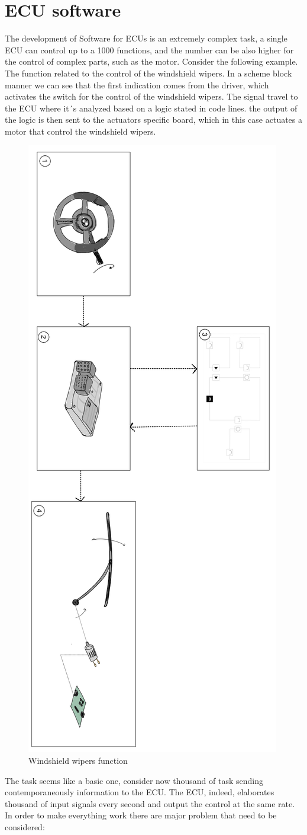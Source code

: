 \documentclass[../main.tex]{subfiles}
\begin{document}
\section{ECU software}
The development of Software for ECUs is an extremely complex task, a single ECU can control up to a 1000 functions, and the number can be also higher for the control of complex parts, such as the motor.
Consider the following example. The function related to the control of the windshield wipers. In a scheme block manner we can see that the first indication comes from the driver, which activates the switch for the control of the windshield wipers. The signal travel to the ECU where it´s analyzed based on a logic stated in code lines. the output of the logic is then sent to the actuators specific board, which in this case actuates a motor that control the windshield wipers.\\
\begin{figure}[H]
    \centering
    \includegraphics[width=0.45\linewidth, angle = 90]{images_folder/windshieldwipersfunction.jpeg}
    \caption{Windshield wipers function}
    \label{fig:WWFunct}
\end{figure}
The task seems like a basic one, consider now thousand of task sending contemporaneously information to the ECU. The ECU, indeed,  elaborates thousand of input signals every second and output the control at the same rate. In order to make everything work there are major problem that need to be considered:
\end{document}

